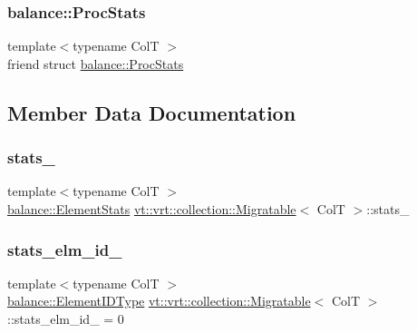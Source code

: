 \subsubsection{\texorpdfstring{balance\+::\+Proc\+Stats}{balance::ProcStats}}
{\footnotesize\ttfamily template$<$typename ColT $>$ \\
friend struct \hyperlink{structvt_1_1vrt_1_1collection_1_1balance_1_1_proc_stats}{balance\+::\+Proc\+Stats}\hspace{0.3cm}{\ttfamily [friend]}}



\subsection{Member Data Documentation}
\mbox{\label{structvt_1_1vrt_1_1collection_1_1_migratable_a311e171ef2dafb9d26975f3677e4fdaa}} 
\subsubsection{\texorpdfstring{stats\+\_\+}{stats\_}}
{\footnotesize\ttfamily template$<$typename ColT $>$ \\
\hyperlink{structvt_1_1vrt_1_1collection_1_1balance_1_1_element_stats}{balance\+::\+Element\+Stats} \hyperlink{structvt_1_1vrt_1_1collection_1_1_migratable}{vt\+::vrt\+::collection\+::\+Migratable}$<$ ColT $>$\+::stats\+\_\+\hspace{0.3cm}{\ttfamily [protected]}}

\mbox{\label{structvt_1_1vrt_1_1collection_1_1_migratable_a905932dd92539fb68fa811c8a21e8e30}} 
\subsubsection{\texorpdfstring{stats\+\_\+elm\+\_\+id\+\_\+}{stats\_elm\_id\_}}
{\footnotesize\ttfamily template$<$typename ColT $>$ \\
\hyperlink{namespacevt_1_1vrt_1_1collection_1_1balance_a14c8d2c972f2913aa3f1636e5be0a120}{balance\+::\+Element\+I\+D\+Type} \hyperlink{structvt_1_1vrt_1_1collection_1_1_migratable}{vt\+::vrt\+::collection\+::\+Migratable}$<$ ColT $>$\+::stats\+\_\+elm\+\_\+id\+\_\+ = 0\hspace{0.3cm}{\ttfamily [protected]}}

